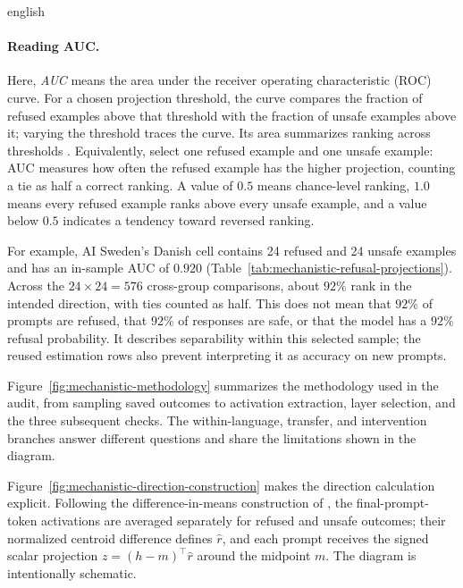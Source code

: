 \begin{otherlanguage*}{english}
\paragraph*{Reading AUC.}\label{par:auc-interpretation}
Here, \emph{AUC} means the area under the receiver operating characteristic (ROC) curve. For a chosen projection threshold, the curve compares the fraction of refused examples above that threshold with the fraction of unsafe examples above it; varying the threshold traces the curve. Its area summarizes ranking across thresholds \cite{hanleyMcNeilAUC1982}. Equivalently, select one refused example and one unsafe example: AUC measures how often the refused example has the higher projection, counting a tie as half a correct ranking. A value of $0.5$ means chance-level ranking, $1.0$ means every refused example ranks above every unsafe example, and a value below $0.5$ indicates a tendency toward reversed ranking.

For example, AI Sweden's Danish cell contains 24 refused and 24 unsafe examples and has an in-sample AUC of $0.920$ (Table~\ref{tab:mechanistic-refusal-projections}). Across the $24\times24=576$ cross-group comparisons, about $92\%$ rank in the intended direction, with ties counted as half. This does not mean that $92\%$ of prompts are refused, that $92\%$ of responses are safe, or that the model has a $92\%$ refusal probability. It describes separability within this selected sample; the reused estimation rows also prevent interpreting it as accuracy on new prompts.

Figure~\ref{fig:mechanistic-methodology} summarizes the methodology used in the audit, from sampling saved outcomes to activation extraction, layer selection, and the three subsequent checks. The within-language, transfer, and intervention branches answer different questions and share the limitations shown in the diagram.



Figure~\ref{fig:mechanistic-direction-construction} makes the direction calculation explicit. Following the difference-in-means construction of \textcite{arditiRefusalLanguageModels2024}, the final-prompt-token activations are averaged separately for refused and unsafe outcomes; their normalized centroid difference defines $\hat r$, and each prompt receives the signed scalar projection $z=(h-m)^\top\hat r$ around the midpoint $m$. The diagram is intentionally schematic.

\MechDirectionConstructionFigure


\end{otherlanguage*}
